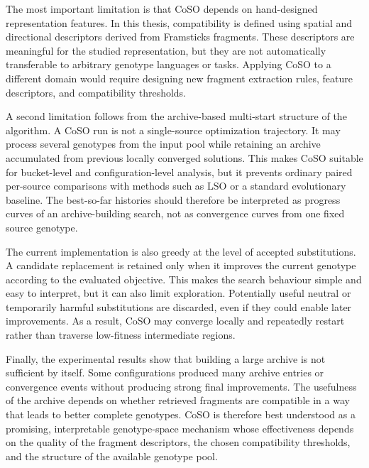 The most important limitation is that CoSO depends on hand-designed representation features. In this thesis, compatibility is defined using spatial and directional descriptors derived from Framsticks \fone{} fragments. These descriptors are meaningful for the studied representation, but they are not automatically transferable to arbitrary genotype languages or tasks. Applying CoSO to a different domain would require designing new fragment extraction rules, feature descriptors, and compatibility thresholds.

A second limitation follows from the archive-based multi-start structure of the algorithm. A CoSO run is not a single-source optimization trajectory. It may process several genotypes from the input pool while retaining an archive accumulated from previous locally converged solutions. This makes CoSO suitable for bucket-level and configuration-level analysis, but it prevents ordinary paired per-source comparisons with methods such as LSO or a standard evolutionary baseline. The best-so-far histories should therefore be interpreted as progress curves of an archive-building search, not as convergence curves from one fixed source genotype.

The current implementation is also greedy at the level of accepted substitutions. A candidate replacement is retained only when it improves the current genotype according to the evaluated objective. This makes the search behaviour simple and easy to interpret, but it can also limit exploration. Potentially useful neutral or temporarily harmful substitutions are discarded, even if they could enable later improvements. As a result, CoSO may converge locally and repeatedly restart rather than traverse low-fitness intermediate regions.

Finally, the experimental results show that building a large archive is not sufficient by itself. Some configurations produced many archive entries or convergence events without producing strong final improvements. The usefulness of the archive depends on whether retrieved fragments are compatible in a way that leads to better complete genotypes. CoSO is therefore best understood as a promising, interpretable genotype-space mechanism whose effectiveness depends on the quality of the fragment descriptors, the chosen compatibility thresholds, and the structure of the available genotype pool.


